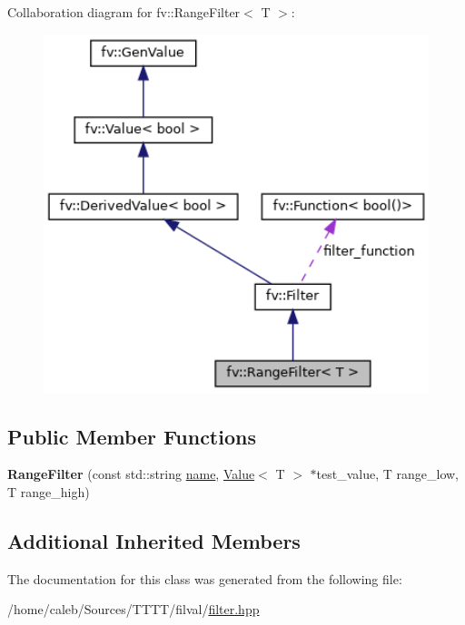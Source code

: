 Collaboration diagram for fv\+:\+:Range\+Filter$<$ T $>$\+:
\nopagebreak
\begin{figure}[H]
\begin{center}
\leavevmode
\includegraphics[width=350pt]{classfv_1_1RangeFilter__coll__graph}
\end{center}
\end{figure}
\subsection*{Public Member Functions}
\begin{DoxyCompactItemize}
\item 
\hypertarget{classfv_1_1RangeFilter_ab4b2d92dddc7d6341876fdcc36278806}{}\label{classfv_1_1RangeFilter_ab4b2d92dddc7d6341876fdcc36278806} 
{\bfseries Range\+Filter} (const std\+::string \hyperlink{classfv_1_1GenValue_a610f89ee441eaad4c9e78f74d6bde93b}{name}, \hyperlink{classfv_1_1Value}{Value}$<$ T $>$ $\ast$test\+\_\+value, T range\+\_\+low, T range\+\_\+high)
\end{DoxyCompactItemize}
\subsection*{Additional Inherited Members}


The documentation for this class was generated from the following file\+:\begin{DoxyCompactItemize}
\item 
/home/caleb/\+Sources/\+T\+T\+T\+T/filval/\hyperlink{filter_8hpp}{filter.\+hpp}\end{DoxyCompactItemize}

